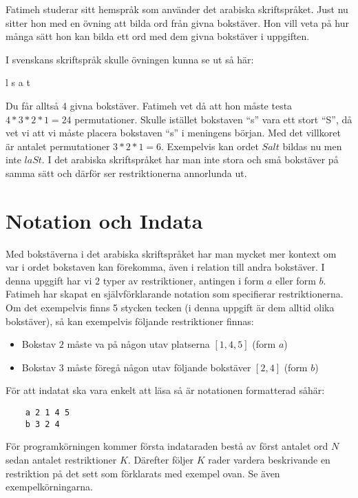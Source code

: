 
Fatimeh studerar sitt hemspråk som använder det arabiska skriftspråket. Just nu
sitter hon med en övning att bilda ord från givna bokstäver. Hon vill veta på
hur många sätt hon kan bilda ett ord med dem givna bokstäver i uppgiften.

I svenskans skriftspråk skulle övningen kunna se ut så här:

\vspace{0.2in}
\centerline{l s a t}
\vspace{0.2in}

Du får alltså 4 givna bokstäver. Fatimeh vet då att hon måste testa $4*3*2*1 =
24$ permutationer. Skulle istället bokstaven ``s'' vara ett stort ``S'', då vet vi
att vi måste placera bokstaven ``s'' i meningens början. Med det villkoret är
antalet permutationer $3*2*1 = 6$.  Exempelvis kan ordet $Salt$ bildas nu men
inte $laSt$. I det arabiska skriftspråket har man inte stora och små bokstäver
på samma sätt och därför ser restriktionerna annorlunda ut.

\section*{Notation och Indata}

Med bokstäverna i det arabiska skriftspråket har man mycket mer kontext om var
i ordet bokstaven kan förekomma, även i relation till andra bokstäver.  I denna
upggift har vi $2$ typer av restriktioner, antingen i form $a$ eller form $b$. Fatimeh har skapat en
självförklarande notation som specifierar restriktionerna. Om det exempelvis
finns 5 stycken tecken (i denna uppgift är dem alltid olika bokstäver), så kan
exempelvis följande restriktioner finnas:

\begin{itemize}
    \item Bokstav $2$ måste va på någon utav platserna $[1, 4, 5]$ (form $a$)
    \item Bokstav $3$ måste föregå någon utav följande bokstäver $[2, 4]$ (form $b$)
\end{itemize}

För att indatat ska vara enkelt att läsa så är notationen formatterad såhär:

\begin{lstlisting}
    a 2 1 4 5
    b 3 2 4
\end{lstlisting}

För programkörningen kommer första indataraden bestå av först antalet ord $N$
sedan antalet restriktioner $K$. Därefter följer $K$ rader vardera beskrivande
en restriktion på det sett som förklarats med exempel ovan. Se även
exempelkörningarna.

